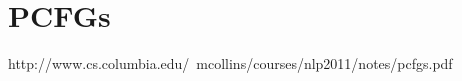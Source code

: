 \documentclass[a4paper,12pt]{article}
\begin{document}
\section{PCFGs}

















\begin{thebibliography}
 http://www.cs.columbia.edu/~mcollins/courses/nlp2011/notes/pcfgs.pdf
\end{thebibliography}
\end{document}
